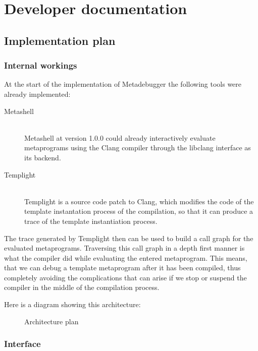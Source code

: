 
\chapter{Developer documentation}

\section{Implementation plan}

\subsection{Internal workings}

At the start of the implementation of Metadebugger the following tools were
already implemented:
\begin{description}
    \item[Metashell]\cite{github} \hfill \\
        Metashell at version 1.0.0 \cite{github-releases} could already
        interactively evaluate metaprograms using the Clang\cite{clang}
        compiler through the libclang\cite{libclang} interface as its backend.
    \item[Templight]\cite{templight} \hfill \\
        Templight is a source code patch to Clang, which modifies the code
        of the template instantation process of the compilation, so that it can
        produce a trace of the template instantiation process.
\end{description}

The trace generated by Templight then can be used to build a call graph for the
evaluated metaprograms. Traversing this call graph in a depth first manner is
what the compiler did while evaluating the entered metaprogram. This means,
that we can debug a template metaprogram after it has been compiled, thus
completely avoiding the complications that can arise if we stop or suspend the
compiler in the middle of the compilation process.

Here is a diagram showing this architecture:

\begin{figure}[H]
    \centering
    
    \caption{Architecture plan}
\end{figure}

\subsection{Interface}

